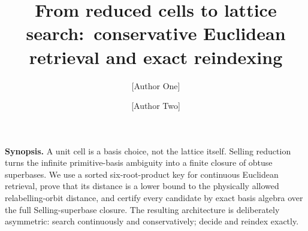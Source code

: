 \documentclass[11pt]{article}
\title{\bfseries From reduced cells to lattice search:\
conservative Euclidean retrieval and exact reindexing}
\author[1]{[Author One]}
\author[1]{[Author Two]}
\affil[1]{[Affiliation], [City], [Country]}
\date{}
\begin{document}
\maketitle

\begin{center}
\begin{minipage}{0.92\textwidth}
\small\noindent\textbf{Synopsis.}
A unit cell is a basis choice, not the lattice itself. Selling reduction turns the infinite primitive-basis ambiguity into a finite closure of obtuse superbases. We use a sorted six-root-product key for continuous Euclidean retrieval, prove that its distance is a lower bound to the physically allowed relabelling-orbit distance, and certify every candidate by exact basis algebra over the full Selling-superbase closure. The resulting architecture is deliberately asymmetric: search continuously and conservatively; decide and reindex exactly.
\end{minipage}
\end{center}
\end{document}
